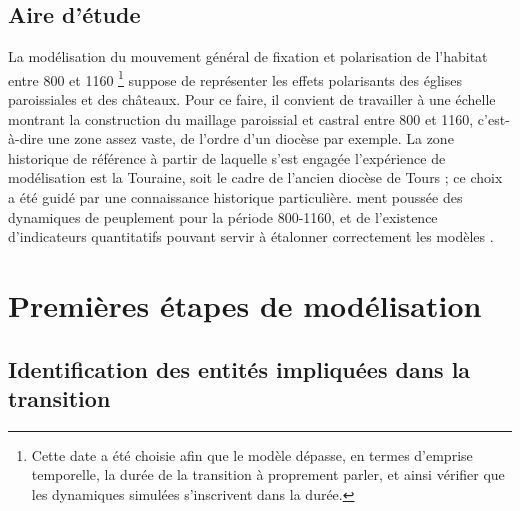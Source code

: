\documentclass[12pt, a4paper, oneside]{book}
\begin{document}
	\subsection{Aire d'étude}	
	
	La modélisation du mouvement général de fixation et polarisation de l'habitat entre 800 et 1160 \footnote{
		Cette date a été choisie afin que le modèle dépasse, en termes d’emprise temporelle, la durée de la transition à proprement parler, et ainsi vérifier que les dynamiques simulées s’inscrivent dans la durée.
	} suppose de représenter les effets polarisants des églises paroissiales et des châteaux.
	Pour ce faire, il convient de travailler à une échelle montrant la construction du maillage paroissial et castral entre 800 et 1160, c'est-à-dire une zone assez vaste, de l'ordre d'un diocèse par exemple.
	La zone historique de référence à partir de laquelle s'est engagée l'expérience de modélisation est la Touraine, soit le cadre de l'ancien diocèse de Tours ; ce choix a été guidé par une connaissance historique particulière.
	ment poussée des dynamiques de peuplement pour la période 800-1160, et de l'existence d'indicateurs quantitatifs pouvant servir à étalonner correctement les modèles \autocite{zadora-rio_paroisses_2008}.
	
	\section{Premières étapes de modélisation}
	
	\subsection{Identification des entités impliquées dans la transition}
	
\end{document}

